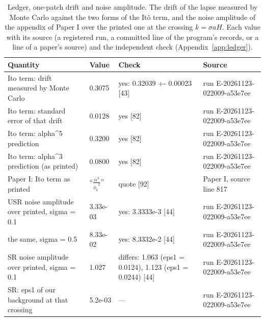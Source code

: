 \begin{table}
\caption{Ledger, one-patch drift and noise amplitude. The drift of the lapse measured by Monte Carlo against the two forms of the It\^o term, and the noise amplitude of the appendix of Paper I over the printed one at the crossing $k = \sigma a H$. Each value with its source (a registered run, a committed line of the program's records, or a line of a paper's source) and the independent check (Appendix~\ref{app:ledger}).}
\label{tab:ledgeronepatchdriftandnoiseamplitude}
\footnotesize
\begin{tabular}{p{}p{}p{}p{}}
\toprule
Quantity & Value & Check & Source \\
\midrule
Ito term: drift measured by Monte Carlo & 0.3075 & yes: 0.32039 +- 0.00023 [43] & run E-20261123-022009-a53e7ee \\
Ito term: standard error of that drift & 0.0128 & yes [82] & run E-20261123-022009-a53e7ee \\
Ito term: alpha\^{}5 prediction & 0.3200 & yes [82] & run E-20261123-022009-a53e7ee \\
Ito term: alpha\^{}3 prediction (as printed) & 0.0800 & yes [82] & run E-20261123-022009-a53e7ee \\
Paper I: Ito term as printed & ``$\frac{\alpha^3}{\dot{\phi_b}^2}$'' & quote [92] & Paper I, source line 817 \\
USR noise amplitude over printed, sigma = 0.1 & 3.33e-03 & yes: 3.3333e-3 [44] & run E-20261123-022009-a53e7ee \\
the same, sigma = 0.5 & 8.33e-02 & yes: 8.3332e-2 [44] & run E-20261123-022009-a53e7ee \\
SR noise amplitude over printed, sigma = 0.1 & 1.027 & differs: 1.063 (eps1 = 0.0124), 1.123 (eps1 = 0.0244) [44] & run E-20261123-022009-a53e7ee \\
SR: eps1 of our background at that crossing & 5.2e-03 & --- & run E-20261123-022009-a53e7ee \\
\bottomrule
\end{tabular}
\end{table}

